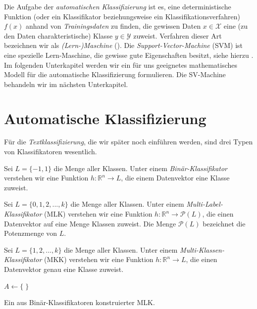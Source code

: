 Die Aufgabe der \emph{automatischen Klassifizierung} ist es, eine deterministische Funktion (oder ein Klassifikator beziehungsweise ein Klassifikationsverfahren) $f(x)$ anhand von \emph{Trainingsdaten} zu finden, die gewissen Daten $x \in \mathcal{X}$ eine (zu den Daten charakteristische) Klasse $y \in \mathcal{Y}$ zuweist. Verfahren dieser Art bezeichnen wir als \emph{(Lern-)Maschine} (\cite{b-tut-1998}). Die \emph{Support-Vector-Machine} (SVM) ist eine spezielle Lern-Maschine, die gewisse \glqq gute\grqq{} Eigenschaften besitzt, siehe hierzu \cite{b-tut-1998}. \\

Im folgenden Unterkapitel werden wir ein für uns geeignetes mathematisches Modell für die automatische Klassifizierung formulieren. Die SV-Machine behandeln wir im nächsten Unterkapitel.

\section{Automatische Klassifizierung}
Für die \emph{Textklassifizierung}, die wir später noch einführen werden, sind drei Typen von Klassifikatoren wesentlich.

\begin{definition}
	Sei $L=\{-1,1\}$ die Menge aller Klassen. Unter einem \emph{Binär-Klassifikator} verstehen wir eine Funktion $h:\mathbb{R}^n \rightarrow L$, die einem Datenvektor eine Klasse zuweist.
\end{definition}

\begin{definition} \label{def:mlk}
	Sei $L=\{0 , 1 , 2 , ... , k\}$ die Menge aller Klassen. Unter einem \emph{Multi-Label-Klassifikator} (MLK) verstehen wir eine Funktion $h:\mathbb{R}^n \rightarrow  \mathcal{P}(L)$, die einen Datenvektor auf eine Menge Klassen zuweist. Die Menge $\mathcal{P}(L)$ bezeichnet die Potenzmenge von $L$.
\end{definition}

\begin{definition}
	Sei $L=\{1 , 2 , ... , k\}$ die Menge aller Klassen. Unter einem \emph{Multi-Klassen-Klassifikator} (MKK) verstehen wir eine Funktion $h:\mathbb{R}^n \rightarrow  L$, die einen Datenvektor genau eine Klasse zuweist. 
\end{definition}

\begin{algorithm}[bhtp]
$A \gets \{ \; \}$ \;
\caption{Ein aus Binär-Klassifikatoren konstruierter MLK.}
\label{alg:mlk}
\end{algorithm}

